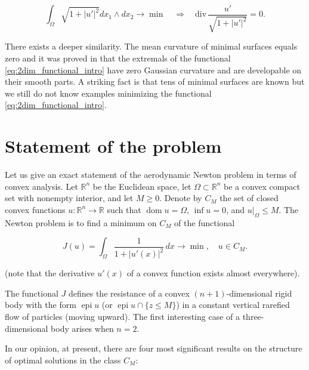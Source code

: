 \documentclass[14pt]{extarticle}
\renewcommand{\le}{\leqslant}
\renewcommand{\ge}{\geqslant}
\newcommand{\R}{\mathbb{R}}
\DeclareMathOperator{\dom}{\mathrm{dom}}
\DeclareMathOperator{\epi}{\mathrm{epi}}
\theoremstyle{remark}
\theoremstyle{definition}
\begin{document}
\[
	\int_\Omega \sqrt{1+|u'|^2}dx_1\wedge dx_2\to\min
	\quad \Longrightarrow \quad
	\mathrm{div}\,\frac{u'}{\sqrt{1+|u'|^2}} = 0.
\]

There exists a deeper similarity. The mean curvature of minimal surfaces equals zero and it was proved in \cite{Buttazzo1995} that the extremals of the functional \eqref{eq:2dim_functional_intro} have zero Gaussian curvature and are developable on their smooth parts. A striking fact is that tens of minimal surfaces are known but we still do not know examples minimizing the functional \eqref{eq:2dim_functional_intro}.

 
\section{Statement of the problem}

Let us give an exact statement of the aerodynamic Newton problem in terms of convex analysis. Let
$\R^n$ be the Euclidean space, let $\Omega\subset\R^n$ be a convex compact set with nonempty interior, and let
$M\ge 0$. Denote by $C_M$ the set of closed convex functions $u:\R^n\to \R$ such that $\dom u = \Omega$, $\inf u=0$, and $u|_{\Omega}\le M$. The Newton problem is to find a minimum on $C_M$ of the functional

\begin{equation}
\label{problem:start}
	J(u) = \int_{\Omega}\frac{1}{1+|u'(x)|^2}\,dx \to \min,\quad u\in C_M.
\end{equation}

\noindent (note that the derivative $u'(x)$ of a convex function exists almost everywhere).

The functional $J$ defines the resistance of a convex $(n+1)$-dimensional rigid body with the form $\epi u$ (or $\epi u\cap\{z\le M\}$) in a constant vertical rarefied flow of particles (moving upward). The first interesting case of a three-dimensional body arises when $n=2$.

In our opinion, at present, there are four most significant results on the structure of optimal solutions in the class $C_M$:
\end{document}
